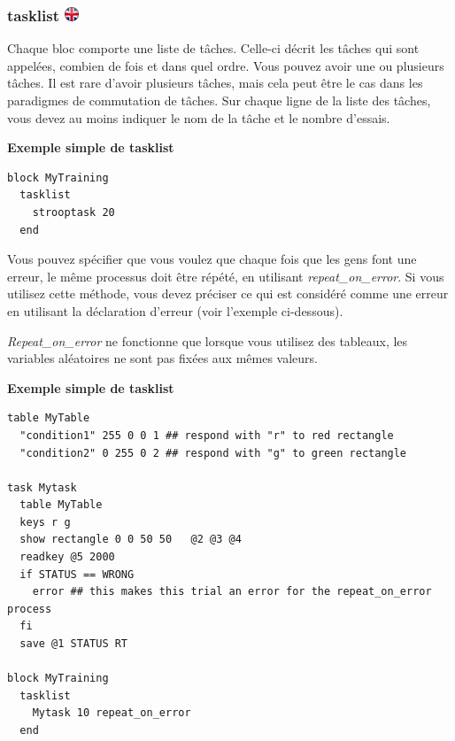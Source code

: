 \documentclass[
]{book}
\begin{document}
\hypertarget{tasklist}{%
\subsubsection[tasklist ]{\texorpdfstring{tasklist \href{https://www.psytoolkit.org/doc3.2.0/syntax.html\#block-tasklist}{\protect\includegraphics{img/ukflag.png}}}{tasklist }}\label{tasklist}}

Chaque bloc comporte une liste de tâches. Celle-ci décrit les tâches qui sont appelées, combien de fois et dans quel ordre. Vous pouvez avoir une ou plusieurs tâches. Il est rare d'avoir plusieurs tâches, mais cela peut être le cas dans les paradigmes de commutation de tâches. Sur chaque ligne de la liste des tâches, vous devez au moins indiquer le nom de la tâche et le nombre d'essais.

\textbf{Exemple simple de tasklist}

\begin{verbatim}
block MyTraining
  tasklist
    strooptask 20
  end
\end{verbatim}

Vous pouvez spécifier que vous voulez que chaque fois que les gens font une erreur, le même processus doit être répété, en utilisant \emph{repeat\_on\_error}. Si vous utilisez cette méthode, vous devez préciser ce qui est considéré comme une erreur en utilisant la déclaration d'erreur (voir l'exemple ci-dessous).

\emph{Repeat\_on\_error} ne fonctionne que lorsque vous utilisez des tableaux, les variables aléatoires ne sont pas fixées aux mêmes valeurs.

\textbf{Exemple simple de tasklist}

\begin{verbatim}
table MyTable
  "condition1" 255 0 0 1 ## respond with "r" to red rectangle
  "condition2" 0 255 0 2 ## respond with "g" to green rectangle

task Mytask
  table MyTable
  keys r g
  show rectangle 0 0 50 50   @2 @3 @4
  readkey @5 2000
  if STATUS == WRONG
    error ## this makes this trial an error for the repeat_on_error process
  fi
  save @1 STATUS RT

block MyTraining
  tasklist
    Mytask 10 repeat_on_error
  end
\end{verbatim}
\end{document}
